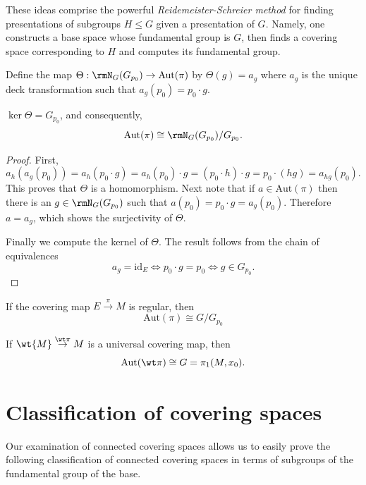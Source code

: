 \begin{rem}
    These ideas comprise the powerful \emph{Reidemeister-Schreier method} for finding presentations of subgroups $H\leq G$ given a presentation of $G$. Namely, one constructs a base space whose fundamental group is $G$, then finds a covering space corresponding to $H$ and computes its fundamental group.
\end{rem}

\begin{defn}
    Define the map $\Theta:\rmN_G(G_{p_0})\to \mathrm{Aut}(\pi)$ by $\Theta(g)=a_g$ where $a_g$ is the unique deck transformation such that $a_g(p_0)=p_0\cdot g$.
\end{defn}
\begin{thm}\label{thm 6.8 Bredon}
    $\ker \Theta=G_{p_0}$, and consequently,
    \[\mathrm{Aut}(\pi)\cong \rmN_G(G_{p_0})\slash G_{p_0}.\]
\end{thm}
\begin{proof}
    First, 
    \[a_h(a_g(p_0))=a_h(p_0\cdot g)=a_h(p_0)\cdot g=(p_0\cdot h)\cdot g=p_0\cdot (hg)=a_{hg}(p_0).\]
    This proves that $\Theta$ is a homomorphism. Next note that if $a\in \mathrm{Aut}(\pi)$ then there is an $g\in \rmN_G(G_{p_0})$ such that $a(p_0)=p_0\cdot g=a_g(p_0)$. Therefore $a=a_g$, which shows the surjectivity of $\Theta$.

    Finally we compute the kernel of $\Theta$. The result follows from the chain of equivalences
    \[a_g=\mathrm{id}_E \Leftrightarrow p_0\cdot g=p_0\Leftrightarrow g\in G_{p_0}.\]
\end{proof}
\begin{cor}
    If the covering map $E\overset{\pi}{\to} M$ is regular, then 
    \[\mathrm{Aut}(\pi)\cong G/G_{p_0}\]
\end{cor}
\begin{cor}
    If $\wt{M}\overset{\wt\pi}{\to} M$ is a universal covering map, then
    \[\mathrm{Aut}(\wt\pi)\cong G=\pi_1(M,x_0).\]
\end{cor}





\section{Classification of covering spaces}

Our examination of connected covering spaces allows us to easily prove the following classification of connected covering spaces in terms of subgroups of the fundamental group of the base.


